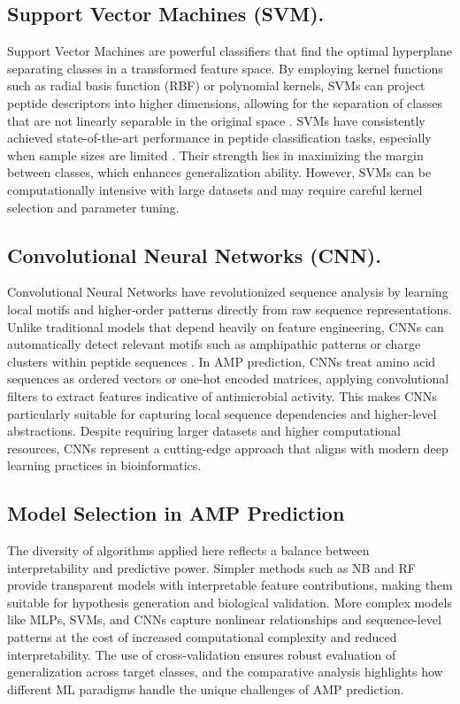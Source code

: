 \documentclass[a4paper,twoside,12pt]{book}
\begin{document}
\subsection{Support Vector Machines (SVM).}
Support Vector Machines are powerful classifiers that find the optimal hyperplane separating classes in a transformed feature space. By employing kernel functions such as radial basis function (RBF) or polynomial kernels, SVMs can project peptide descriptors into higher dimensions, allowing for the separation of classes that are not linearly separable in the original space \cite{bib:cortes1995}. SVMs have consistently achieved state-of-the-art performance in peptide classification tasks, especially when sample sizes are limited \cite{bib:meher2017}. Their strength lies in maximizing the margin between classes, which enhances generalization ability. However, SVMs can be computationally intensive with large datasets and may require careful kernel selection and parameter tuning.

\subsection{Convolutional Neural Networks (CNN).}
Convolutional Neural Networks have revolutionized sequence analysis by learning local motifs and higher-order patterns directly from raw sequence representations. Unlike traditional models that depend heavily on feature engineering, CNNs can automatically detect relevant motifs such as amphipathic patterns or charge clusters within peptide sequences \cite{bib:ma2022}. In AMP prediction, CNNs treat amino acid sequences as ordered vectors or one-hot encoded matrices, applying convolutional filters to extract features indicative of antimicrobial activity. This makes CNNs particularly suitable for capturing local sequence dependencies and higher-level abstractions. Despite requiring larger datasets and higher computational resources, CNNs represent a cutting-edge approach that aligns with modern deep learning practices in bioinformatics.

\subsection{Model Selection in AMP Prediction}
The diversity of algorithms applied here reflects a balance between interpretability and predictive power. Simpler methods such as NB and RF provide transparent models with interpretable feature contributions, making them suitable for hypothesis generation and biological validation. More complex models like MLPs, SVMs, and CNNs capture nonlinear relationships and sequence-level patterns at the cost of increased computational complexity and reduced interpretability. The use of cross-validation ensures robust evaluation of generalization across target classes, and the comparative analysis highlights how different ML paradigms handle the unique challenges of AMP prediction.
\end{document}
